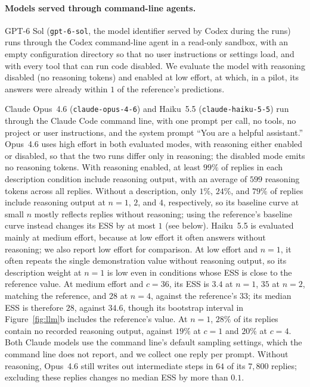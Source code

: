 \documentclass{article}
\theoremstyle{definition}
\begin{document}
\paragraph{Models served through command-line agents.}
GPT-6 Sol (\texttt{gpt-6-sol}, the model identifier served by Codex during the runs) runs through the Codex command-line agent in a read-only sandbox, with an empty configuration directory so that no user instructions or settings load, and with every tool that can run code disabled. We evaluate the model with reasoning disabled (no reasoning tokens) and enabled at low effort, at which, in a pilot, its answers were already within $1$ of the reference's predictions.

Claude Opus~4.6 (\texttt{claude-opus-4-6}) and Haiku~5.5 (\texttt{claude-haiku-5-5}) run through the Claude Code command line, with one prompt per call, no tools, no project or user instructions, and the system prompt ``You are a helpful assistant.'' Opus~4.6 uses high effort in both evaluated modes, with reasoning either enabled or disabled, so that the two runs differ only in reasoning; the disabled mode emits no reasoning tokens. With reasoning enabled, at least $99\%$ of replies in each description condition include reasoning output, with an average of $599$ reasoning tokens across all replies. Without a description, only $1\%$, $24\%$, and $79\%$ of replies include reasoning output at $n=1$, $2$, and $4$, respectively, so its baseline curve at small $n$ mostly reflects replies without reasoning; using the reference's baseline curve instead changes its ESS by at most $1$ (see below). Haiku~5.5 is evaluated mainly at medium effort, because at low effort it often answers without reasoning; we also report low effort for comparison. At low effort and $n=1$, it often repeats the single demonstration value without reasoning output, so its description weight at $n=1$ is low even in conditions whose ESS is close to the reference value. At medium effort and $c=36$, its ESS is $3.4$ at $n=1$, $35$ at $n=2$, matching the reference, and $28$ at $n=4$, against the reference's $33$; its median ESS is therefore $28$, against $34.6$, though its bootstrap interval in Figure~\ref{fig:llm}b includes the reference's value. At $n=1$, $28\%$ of its replies contain no recorded reasoning output, against $19\%$ at $c=1$ and $20\%$ at $c=4$. Both Claude models use the command line's default sampling settings, which the command line does not report, and we collect one reply per prompt. Without reasoning, Opus~4.6 still writes out intermediate steps in $64$ of its $7{,}800$ replies; excluding these replies changes no median ESS by more than $0.1$.
\end{document}
